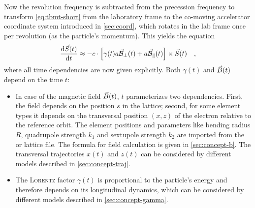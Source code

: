 \documentclass[a4paper]{scrartcl}
\begin{document}
Now the revolution frequency \wrev is subtracted from the precession frequency to
transform \cref{eq:tbmt-short} from the laboratory frame to the co-moving accelerator
coordinate system introduced in \cref{sec:coord}, which rotates in the lab frame once per
revolution (as the particle's momentum). This yields the equation
\begin{equation}
  \label{eq:tbmt-pole}
  \frac{\text{d} \vec{S}_{}(t)}{\text{d} t} \approx - c\cdot \left[ \gamma(t)a\vec{\mathcal{B}}_{\bot}(t) + a\vec{\mathcal{B}}_{\parallel}(t) \right]
  \times\vec{S}_{}(t) \quad,
\end{equation}
where all time dependencies are now given explicitly.
%
Both $\gamma(t)$ and $\vec{B}(t)$ depend on the time $t$:
\begin{itemize}
\item In case of the magnetic field $\vec{B}(t)$, $t$ parameterizes two dependencies. First, the field
  depends on the position $s$ in the lattice; second, for some element types it depends on the transversal position
  $(x,z)$ of the electron relative to the reference orbit. The
  element positions and parameters like bending radius $R$, quadrupole strength $k_1$ and
  sextupole strength $k_2$ are imported from the \ele or \madx lattice file. The formula
  for field calculation is given in \cref{sec:concept-b}. The transversal
  trajectories $x(t)$ and $z(t)$ can be considered by different models described in
  \cref{sec:concept-traj}.
  \item The \textsc{Lorentz} factor $\gamma(t)$ is proportional to the particle's energy and
  therefore depends on its longitudinal dynamics, which can be considered by different
  models described in \cref{sec:concept-gamma}.
\end{itemize}
\end{document}
